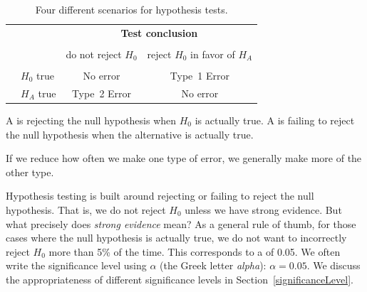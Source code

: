 
\begin{table}%
\centering
\begin{tabular}{l l c c}
& & \multicolumn{2}{c}{\textbf{Test conclusion}} \\
  \cline{3-4}
\vspace{-3.7mm} \\
& & do not reject $H_0$ &  reject $H_0$ in favor of $H_A$ \\
  \cline{2-4}
\vspace{-3.7mm} \\
& $H_0$ true & No error &  Type~1 Error \\
\raisebox{1.5ex}{\textbf{Truth}} & $H_A$ true & Type~2 Error & No error \\
  \cline{2-4}
\end{tabular}
\caption{Four different scenarios for hypothesis tests.}
\label{fourHTScenarios}
\end{table}

A  is rejecting the null hypothesis when $H_0$ is actually true. A  is failing to reject the null hypothesis when the alternative is actually true.



If we reduce how often we make one type of error, we generally make more of the other type.

Hypothesis testing is built around rejecting or failing to reject the null hypothesis. That is, we do not reject $H_0$ unless we have strong evidence. But what precisely does \emph{strong evidence} mean? As a general rule of thumb, for those cases where the null hypothesis is actually true, we do not want to incorrectly reject $H_0$ more than 5\% of the time. This corresponds to a  of 0.05. We often write the significance level using $\alpha$ (the Greek letter \emph{alpha}): $\alpha = 0.05$. We discuss the appropriateness of different significance levels in Section~\ref{significanceLevel}.

